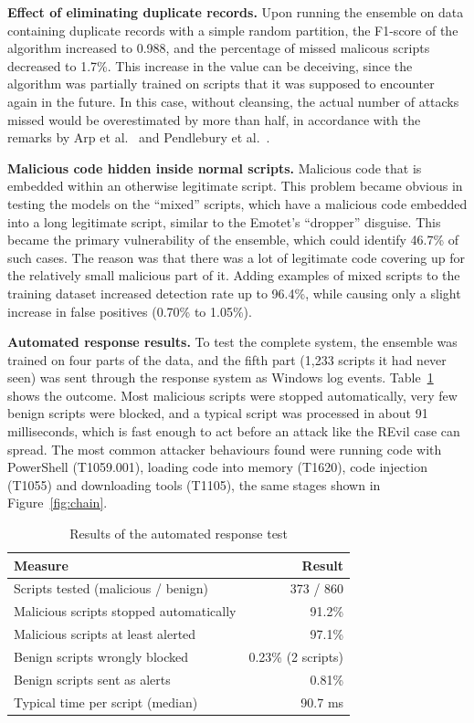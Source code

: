 \documentclass[12pt,a4paper]{article}
\newcommand{\head}[1]{\noindent\textbf{#1}\quad}
\begin{document}
\head{Effect of eliminating duplicate records.} Upon running the ensemble on data containing duplicate records with a simple random partition, the F1-score of the algorithm increased to 0.988, and the percentage of missed malicous scripts decreased to 1.7\%. This increase in the value can be deceiving, since the algorithm was partially trained on scripts that it was supposed to encounter again in the future. In this case, without cleansing, the actual number of attacks missed would be overestimated by more than half, in accordance with the remarks by Arp et al.~\cite{arp2022} and Pendlebury et al.~\cite{pendlebury2019}.

\head{Malicious code hidden inside normal scripts.} Malicious code that is embedded within an otherwise legitimate script. This problem became obvious in testing the models on the ``mixed'' scripts, which have a malicious code embedded into a long legitimate script, similar to the Emotet's ``dropper'' disguise. This became the primary vulnerability of the ensemble, which could identify 46.7\% of such cases. The reason was that there was a lot of legitimate code covering up for the relatively small malicious part of it. Adding examples of mixed scripts to the training dataset increased detection rate up to 96.4\%, while causing only a slight increase in false positives (0.70\% to 1.05\%).

\head{Automated response results.} To test the complete system, the ensemble was trained on four parts of the data, and the fifth part (1,233 scripts it had never seen) was sent through the response system as Windows log events. Table~\ref{tab:response} shows the outcome. Most malicious scripts were stopped automatically, very few benign scripts were blocked, and a typical script was processed in about 91 milliseconds, which is fast enough to act before an attack like the REvil case can spread. The most common attacker behaviours found were running code with PowerShell (T1059.001), loading code into memory (T1620), code injection (T1055) and downloading tools (T1105), the same stages shown in Figure~\ref{fig:chain}.

\begin{table}[htbp]
\centering
\caption{Results of the automated response test}\label{tab:response}
\begin{tabular}{lr}
\toprule
\textbf{Measure} & \textbf{Result}\\
\midrule
Scripts tested (malicious / benign) & 373 / 860\\
Malicious scripts stopped automatically & 91.2\%\\
Malicious scripts at least alerted & 97.1\%\\
Benign scripts wrongly blocked & 0.23\% (2 scripts)\\
Benign scripts sent as alerts & 0.81\%\\
Typical time per script (median) & 90.7 ms\\
\bottomrule
\end{tabular}
\end{table}
\end{document}
